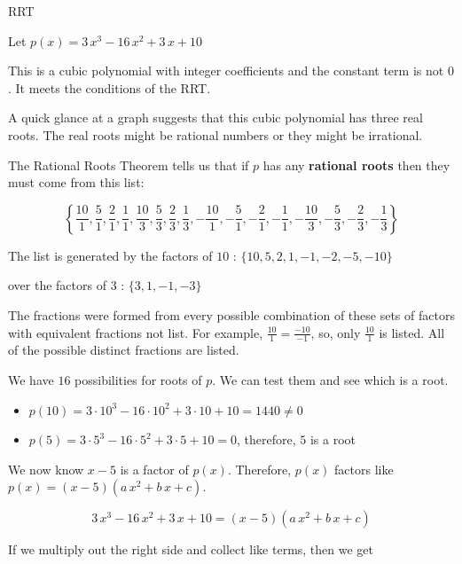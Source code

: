 \documentclass{ximera}
\begin{document}
\begin{example} RRT


Let $p(x) = 3\, x^3 - 16 \, x^2 + 3 \, x + 10$ 


This is a cubic polynomial with integer coefficients and the constant term is not $0$. It meets the conditions of the RRT.


A quick glance at a graph suggests that this cubic polynomial has three real roots. The real roots might be rational numbers or they might be irrational.

The Rational Roots Theorem tells us that if $p$ has any \textbf{rational roots} then they must come from this list:


\[
\left\{  \frac{10}{1},  \frac{5}{1}, \frac{2}{1}, \frac{1}{1}, \frac{10}{3},  \frac{5}{3}, \frac{2}{3}, \frac{1}{3},   -\frac{10}{1},  -\frac{5}{1}, -\frac{2}{1}, -\frac{1}{1}, -\frac{10}{3},  -\frac{5}{3}, -\frac{2}{3}, -\frac{1}{3}                   \right\}
\]


The list is generated by the factors of $10$ : $\{ 10, 5, 2, 1, -1, -2, -5, -10 \}$ 

over the factors of $3$ : $\{ 3, 1, -1, -3 \}$ 


The fractions were formed from every possible combination of these sets of factors with equivalent fractions not list.  For example, $\frac{10}{1} = \frac{-10}{-1}$, so, only $\frac{10}{1}$ is listed.  All of the possible distinct fractions are listed.


We have $16$ possibilities for roots of $p$.  We can test them and see which is a root.


\begin{itemize}
\item $p(10) =  3 \cdot 10^3 - 16 \cdot 10^2 + 3 \cdot 10 + 10 = 1440 \ne 0$ \\
\item $p(5) =  3 \cdot 5^3 - 16 \cdot 5^2 + 3 \cdot 5 + 10 = 0$, therefore,  $5$ is a root\\
\end{itemize}


We now know $x-5$ is a factor of $p(x)$.  Therefore, $p(x)$ factors like $p(x) = (x-5) (a \, x^2 + b \, x + c)$.







\[
3\, x^3 - 16 \, x^2 + 3 \, x + 10  = (x-5) (a \, x^2 + b \, x + c) 
\]


If we multiply out the right side and collect like terms, then we get



\end{example}
\end{document}
